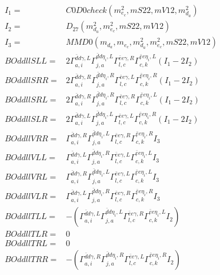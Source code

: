 \documentclass[A4,landscape]{article}
\begin{document}
\begin{align} 
I_1 = & C0D0check(m^2_{e_{{c}}}, mS22, mV12, m^2_{d_{{a}}}) \\ 
I_2 = & D_{27}(m^2_{d_{{a}}}, m^2_{e_{{c}}}, mS22, mV12) \\ 
I_3 = & MMD0(m_{d_{{a}}}, m_{e_{{c}}}, m^2_{d_{{a}}}, m^2_{e_{{c}}}, mS22, mV12) \\ 
  BOddllSLL= & 2  \Gamma^{\bar{d}d \gamma ,L}_{a, i} \Gamma^{\bar{d}d \eta_i ,L}_{j, a} \Gamma^{\bar{e}e \gamma ,R}_{l, c} \Gamma^{\bar{e}e \eta_i ,L}_{c, k} (I_1 - 2 I_2) \\ 
  BOddllSRR= & 2  \Gamma^{\bar{d}d \gamma ,R}_{a, i} \Gamma^{\bar{d}d \eta_i ,R}_{j, a} \Gamma^{\bar{e}e \gamma ,L}_{l, c} \Gamma^{\bar{e}e \eta_i ,R}_{c, k} (I_1 - 2 I_2) \\ 
  BOddllSRL= & 2  \Gamma^{\bar{d}d \gamma ,R}_{a, i} \Gamma^{\bar{d}d \eta_i ,R}_{j, a} \Gamma^{\bar{e}e \gamma ,R}_{l, c} \Gamma^{\bar{e}e \eta_i ,L}_{c, k} (I_1 - 2 I_2) \\ 
  BOddllSLR= & 2  \Gamma^{\bar{d}d \gamma ,L}_{a, i} \Gamma^{\bar{d}d \eta_i ,L}_{j, a} \Gamma^{\bar{e}e \gamma ,L}_{l, c} \Gamma^{\bar{e}e \eta_i ,R}_{c, k} (I_1 - 2 I_2) \\ 
  BOddllVRR= &  \Gamma^{\bar{d}d \gamma ,R}_{a, i} \Gamma^{\bar{d}d \eta_i ,L}_{j, a} \Gamma^{\bar{e}e \gamma ,R}_{l, c} \Gamma^{\bar{e}e \eta_i ,R}_{c, k} I_3 \\ 
  BOddllVLL= &  \Gamma^{\bar{d}d \gamma ,L}_{a, i} \Gamma^{\bar{d}d \eta_i ,R}_{j, a} \Gamma^{\bar{e}e \gamma ,L}_{l, c} \Gamma^{\bar{e}e \eta_i ,L}_{c, k} I_3 \\ 
  BOddllVRL= &  \Gamma^{\bar{d}d \gamma ,R}_{a, i} \Gamma^{\bar{d}d \eta_i ,L}_{j, a} \Gamma^{\bar{e}e \gamma ,L}_{l, c} \Gamma^{\bar{e}e \eta_i ,L}_{c, k} I_3 \\ 
  BOddllVLR= &  \Gamma^{\bar{d}d \gamma ,L}_{a, i} \Gamma^{\bar{d}d \eta_i ,R}_{j, a} \Gamma^{\bar{e}e \gamma ,R}_{l, c} \Gamma^{\bar{e}e \eta_i ,R}_{c, k} I_3 \\ 
  BOddllTLL= & -( \Gamma^{\bar{d}d \gamma ,L}_{a, i} \Gamma^{\bar{d}d \eta_i ,L}_{j, a} \Gamma^{\bar{e}e \gamma ,R}_{l, c} \Gamma^{\bar{e}e \eta_i ,L}_{c, k} I_2) \\ 
  BOddllTLR= & 0 \\ 
  BOddllTRL= & 0 \\ 
  BOddllTRR= & -( \Gamma^{\bar{d}d \gamma ,R}_{a, i} \Gamma^{\bar{d}d \eta_i ,R}_{j, a} \Gamma^{\bar{e}e \gamma ,L}_{l, c} \Gamma^{\bar{e}e \eta_i ,R}_{c, k} I_2) \\ 
\end{align} 
\end{document}
